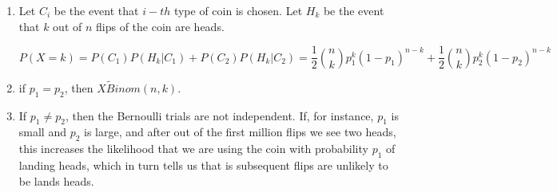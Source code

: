 \begin{enumerate}[label=(\alph*)]
\item Let $C_{i}$ be the event that $i-th$ type of coin is chosen. Let $H_{k}$
be the event that $k$ out of $n$ flips of the coin are heads.

$$P(X = k) = P(C_{1})P(H_{k}|C_{1}) + P(C_{2})P(H_{k}|C_{2}) = \frac{1}{2}
\binom{n}{k}p_{1}^{k}(1-p_{1})^{n-k}+ \frac{1}{2}
\binom{n}{k}p_{2}^{k}(1-p_{2})^{n-k}$$

\item if $p_{1} = p_{2}$, then $X \tilde Binom(n, k)$.

\item If $p_{1} \neq p_{2}$, then the Bernoulli trials are not independent. If,
for instance, $p_{1}$ is small and $p_{2}$ is large, and after out of the first
million flips we see two heads, this increases the likelihood that we are using
the coin with probability $p_{1}$ of landing heads, which in turn tells us that
is subsequent flips are unlikely to be lands heads.
\end{enumerate}
